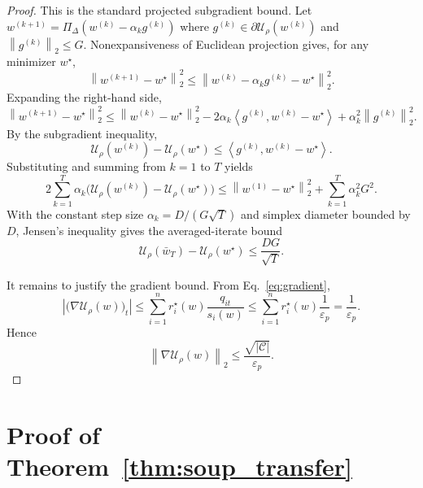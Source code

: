 \documentclass{article}
\newcommand{\cC}{\mathcal{C}}
\newcommand{\simplex}{\Delta}
\newcommand{\norm}[1]{\left\lVert #1 \right\rVert}
\newcommand{\inner}[2]{\left\langle #1, #2 \right\rangle}
\begin{document}
\begin{proof}
This is the standard projected subgradient bound. Let $w^{(k+1)}=\Pi_{\simplex}(w^{(k)}-\alpha_k g^{(k)})$ where $g^{(k)}\in \partial \mathcal U_{\rho}(w^{(k)})$ and $\norm{g^{(k)}}_2\le G$. Nonexpansiveness of Euclidean projection gives, for any minimizer $w^{\star}$,
\[
    \norm{w^{(k+1)}-w^{\star}}_2^2
    \le
    \norm{w^{(k)}-\alpha_k g^{(k)}-w^{\star}}_2^2.
\]
Expanding the right-hand side,
\[
    \norm{w^{(k+1)}-w^{\star}}_2^2
    \le
    \norm{w^{(k)}-w^{\star}}_2^2
    -2\alpha_k \inner{g^{(k)}}{w^{(k)}-w^{\star}}
    + \alpha_k^2 \norm{g^{(k)}}_2^2.
\]
By the subgradient inequality,
\[
    \mathcal U_{\rho}(w^{(k)})-\mathcal U_{\rho}(w^{\star})
    \le
    \inner{g^{(k)}}{w^{(k)}-w^{\star}}.
\]
Substituting and summing from $k=1$ to $T$ yields
\[
    2\sum_{k=1}^{T}\alpha_k\big(\mathcal U_{\rho}(w^{(k)})-\mathcal U_{\rho}(w^{\star})\big)
    \le
    \norm{w^{(1)}-w^{\star}}_2^2
    + \sum_{k=1}^{T}\alpha_k^2 G^2.
\]
With the constant step size $\alpha_k = D/(G\sqrt{T})$ and simplex diameter bounded by $D$, Jensen's inequality gives the averaged-iterate bound
\[
    \mathcal U_{\rho}(\bar w_T)-\mathcal U_{\rho}(w^{\star})
    \le
    \frac{DG}{\sqrt{T}}.
\]

It remains to justify the gradient bound. From Eq.~\eqref{eq:gradient},
\[
    \left|\big(\nabla \mathcal U_{\rho}(w)\big)_t\right|
    \le
    \sum_{i=1}^{n} r_i^{\star}(w)\frac{q_{it}}{s_i(w)}
    \le
    \sum_{i=1}^{n} r_i^{\star}(w)\frac{1}{\varepsilon_p}
    =
    \frac{1}{\varepsilon_p}.
\]
Hence
\[
    \norm{\nabla \mathcal U_{\rho}(w)}_2
    \le
    \frac{\sqrt{|\cC|}}{\varepsilon_p}.
\]
\end{proof}

\section{Proof of Theorem~\ref{thm:soup_transfer}}
\end{document}
